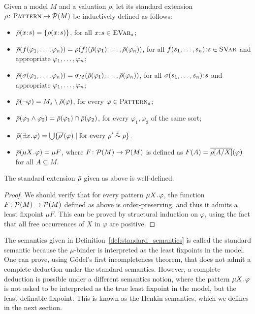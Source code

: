 \documentclass{amsart}
\begin{document}
\begin{definition}
\label{def:standard_semantics}

Given a model $M$ and a valuation $\rho$,
let its standard extension $\bar{\rho} \colon \textnormal{\textsc{Pattern}} \to \mathcal{P}(M)$
be inductively defined as follows:
\begin{itemize}
\item $\bar{\rho}(x \mathbin{\!:\!} s) = \{\rho(x \mathbin{\!:\!} s)\}$, 
for all $x \mathbin{\!:\!} s \in {\normalfont\textsc{EVar}}_s$;
\item $\bar{\rho}(f(\varphi_1 , \dots, \varphi_n)) = 
\rho(f)(\bar{\rho}(\varphi_1) ,\dots, \bar{\rho}(\varphi_n))$, 
for all $f(s_1,\dots,s_n) \mathbin{\!:\!} s \in {\normalfont\textsc{SVar}}$
and appropriate $\varphi_1 ,\dots, \varphi_n$;
\item $\bar{\rho}(\sigma(\varphi_1 ,\dots, \varphi_n))
= \sigma_M( \bar{\rho}(\varphi_1) ,\dots, \bar{\rho}(\varphi_n) )$,
for all $\sigma(s_1,\dots,s_n) \mathbin{\!:\!} s$
and appropriate $\varphi_1 ,\dots, \varphi_n$;
\item $\bar{\rho}(\neg \varphi) = M_s \setminus \bar{\rho}(\varphi)$,
      for every $\varphi \in \textnormal{\textsc{Pattern}}_s$;
\item $\bar{\rho}(\varphi_1 \wedge \varphi_2)
       = \bar{\rho}(\varphi_1) \cap \bar{\rho}(\varphi_2)$,
      for every $\varphi_1,\varphi_2$ of the same sort;
\item $\bar{\rho}(\exists x \mathbin{\!.\!} \varphi) 
       = \bigcup \{ \overline{\rho'}(\varphi) 
                    \mid \text{for every $\rho' \overset{x}{\sim} \rho$} \}$.
\item $\bar{\rho}(\mu X \mathbin{\!.\!} \varphi) = \mu F$,
where $F \colon \mathcal{P}(M) \to \mathcal{P}(M)$ is defined as
$F(A) = \overline{\rho[A/X]}(\varphi)$ for all $A \subseteq M$.
\end{itemize}

\end{definition}

\begin{proposition}
The standard extension $\bar{\rho}$ given as above is well-defined.
\end{proposition}
\begin{proof}
We should verify that for every pattern $\mu X \mathbin{\!.\!} \varphi$,
the function $F \colon \mathcal{P}(M) \to \mathcal{P}(M)$ defined as above is
order-preserving, and thus it admits a least fixpoint $\mu F$.
This can be proved by structural induction on $\varphi$, using
the fact that all free occurrences of $X$ in $\varphi$ are positive.
\end{proof}

The semantics given in Definition~\ref{def:standard_semantics}
is called the standard semantic because the $\mu$-binder
is interpreted as the least fixpoints in the model.
One can prove, using G\"odel's first incompleteness theorem,
that \MmL does not admit a complete deduction under the standard semantics.
However, a complete deduction is possible under a different semantics notion,
where the pattern $\mu X \mathbin{\!.\!} \varphi$ is not asked to be interpreted as
the true least fixpoint in the model, but the least definable fixpoint.
This is known as the Henkin semantics, which we defines in the next section.
\end{document}

